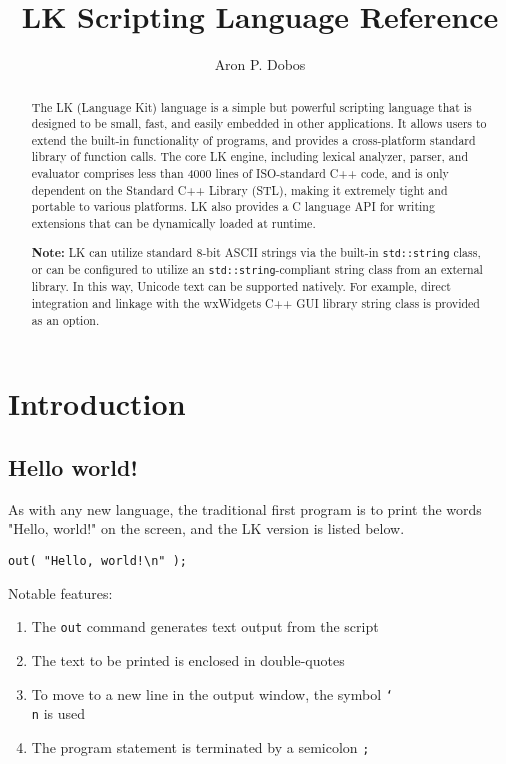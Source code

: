 \documentclass{article}
\title{LK Scripting Language Reference}
\author{Aron P. Dobos}
\newcommand\bslash{\char`\\}
\begin{document}
\maketitle
\vspace{3in}
\begin{abstract}
The LK (Language Kit) language is a simple but powerful scripting language that is designed to be small, fast, and easily embedded in other applications.  It allows users to extend the built-in functionality of programs, and provides a cross-platform standard library of function calls.  The core LK engine, including lexical analyzer, parser, and evaluator comprises less than 4000 lines of ISO-standard C++ code, and is only dependent on the Standard C++ Library (STL), making it extremely tight and portable to various platforms.  LK also provides a C language API for writing extensions that can be dynamically loaded at runtime.

\textbf{Note:} LK can utilize standard 8-bit ASCII strings via the built-in \texttt{std::string} class, or can be configured to utilize an \texttt{std::string}-compliant string class from an external library.  In this way, Unicode text can be supported natively.  For example, direct integration and linkage with the wxWidgets C++ GUI library string class is provided as an option.
\end{abstract} 

\newpage
\tableofcontents
\newpage
\section{Introduction}
\subsection{Hello world!}

As with any new language, the traditional first program is to print the words "Hello, world!" on the screen, and the LK version is listed below.

\begin{verbatim}
out( "Hello, world!\n" );
\end{verbatim}

Notable features:
\begin{enumerate}
\item The \texttt{out} command generates text output from the script
\item The text to be printed is enclosed in double-quotes
\item To move to a new line in the output window, the symbol \texttt{\bslash n} is used
\item The program statement is terminated by a semicolon \texttt{;}
\end{enumerate}
\end{document}
